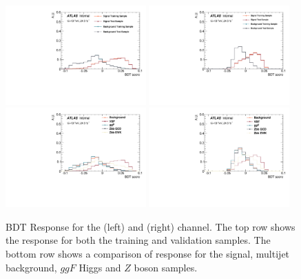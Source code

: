 \begin{figure}[htbp]
  \centering
 \includegraphics[width=0.48\textwidth]{figures/VBF/BDT_score_2cen.pdf}
 \includegraphics[width=0.48\textwidth]{figures/VBF/BDT_score_4cen.pdf}\\
 \includegraphics[width=0.48\textwidth]{figures/VBF/BDT_score_breakdown_2cen.pdf}
 \includegraphics[width=0.48\textwidth]{figures/VBF/BDT_score_breakdown_4cen.pdf}\\
\caption{BDT Response for  the \twocentral (left) and \fourcentral (right) channel.  The top row shows the response for both the training and validation samples.  The bottom row shows a comparison of response for the signal, multijet background, $ggF$ Higgs and $Z$ boson samples. }
  \label{fig:vbf-BDTResponse}
\end{figure}


